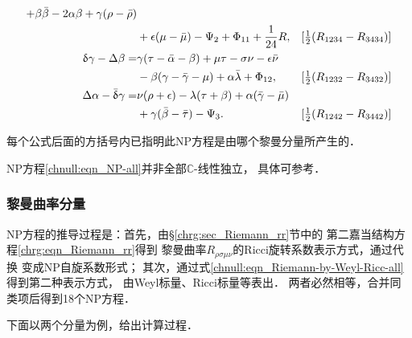 \begin{small}
\begin{subequations}
\begin{align}
        +\beta \bar{\beta }-2\alpha \beta +\gamma (\rho -\bar{\rho }) & \notag \\
        & +\epsilon (\mu -\bar{\mu })-\Psi _{2} + \Phi_{11} +\frac{1}{24}R,
        &[\tfrac{1}{2}(R_{1234}-R_{3434})] \label{chnull:eqn_NP-all-R1234-3434} \\
        \updelta \gamma -\Delta \beta =& \gamma (\tau -\bar{\alpha }-\beta )+\mu \tau -\sigma \nu
        -\epsilon \bar{\nu } \notag \\
        &-\beta (\gamma -\bar{\gamma } -\mu )  +\alpha \bar{\lambda } + \Phi_{12},
        & [\tfrac{1}{2}(R_{1232}-R_{3432})]  \label{chnull:eqn_NP-all-R1232-3432} \\
        \Delta \alpha -\bar{\updelta }\gamma =&\nu (\rho +\epsilon )-\lambda (\tau +\beta )
        +\alpha (\bar{\gamma }-\bar{\mu }) \notag \\
        &+\gamma (\bar{ \beta }-\bar{\tau })-\Psi _{3}.
        & [\tfrac{1}{2}(R_{1242}-R_{3442})] \label{chnull:eqn_NP-all-R1242-3442}
    \end{align}
\end{subequations} %
\end{small}
每个公式后面的方括号内已指明此NP方程是由哪个黎曼分量所产生的．

NP方程\eqref{chnull:eqn_NP-all}并非全部$\mathbb{C}$-线性独立，
具体可参考\parencite[\S 4.2]{Luqk-2026}．


\subsubsection{黎曼曲率分量}
NP方程的推导过程是：首先，由\S\ref{chrg:sec_Riemann_rr}节中的
第二嘉当结构方程\eqref{chrg:eqn_Riemann_rr}得到
黎曼曲率$R_{\rho\sigma\mu\nu}$的Ricci旋转系数表示方式，通过代换
变成NP自旋系数形式；
其次，通过式\eqref{chnull:eqn_Riemann-by-Weyl-Ricc-all}得到第二种表示方式，
由Weyl标量、Ricci标量等表出．
两者必然相等，合并同类项后得到18个NP方程．

下面以两个分量为例，给出计算过程．

